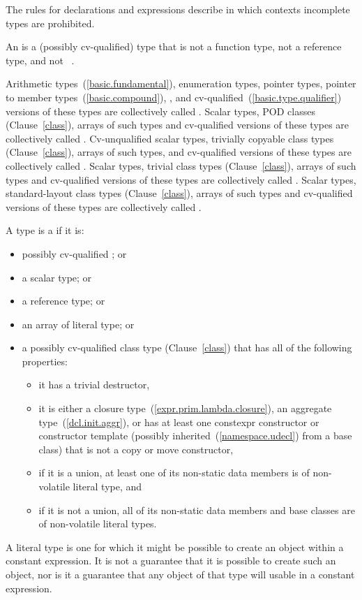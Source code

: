 \pnum
\begin{note} The rules for declarations and expressions describe in which
contexts incomplete types are prohibited. \end{note}

\pnum
An  is a (possibly cv-qualified) type that is not
a function type, not a reference type, and not \cv{}~.

\pnum
Arithmetic types~(\ref{basic.fundamental}), enumeration types, pointer
types, pointer to member types~(\ref{basic.compound}),
,
and
cv-qualified~(\ref{basic.type.qualifier}) versions of these
types are collectively called
. Scalar types,
POD classes (Clause~\ref{class}), arrays of such types and
cv-qualified versions of these
types are collectively called
.
Cv-unqualified scalar types, trivially copyable class types (Clause~\ref{class}), arrays of
such types, and cv-qualified versions of these
types are collectively called .
Scalar types, trivial class types (Clause~\ref{class}),
arrays of such types and cv-qualified versions of these
types are collectively called
. Scalar types, standard-layout class
types (Clause~\ref{class}), arrays of such types and
cv-qualified versions of these types
are collectively called .

\pnum
A type is a  if it is:
\begin{itemize}
\item possibly cv-qualified ; or
\item a scalar type; or
\item a reference type; or
\item an array of literal type; or
\item a possibly cv-qualified class type (Clause~\ref{class}) that
has all of the following properties:
\begin{itemize}
\item it has a trivial destructor,
\item it is either a closure type~(\ref{expr.prim.lambda.closure}),
an aggregate type~(\ref{dcl.init.aggr}), or
has at least one constexpr constructor or constructor template
(possibly inherited~(\ref{namespace.udecl}) from a base class)
that is not a copy or move constructor,
\item if it is a union, at least one of its non-static data members is
of non-volatile literal type, and
\item if it is not a union, all of its non-static data members and base classes are
of non-volatile literal types.
\end{itemize}
\end{itemize}
\begin{note}
A literal type is one for which
it might be possible to create an object
within a constant expression.
It is not a guarantee that it is possible to create such an object,
nor is it a guarantee that any object of that type
will usable in a constant expression.
\end{note}

